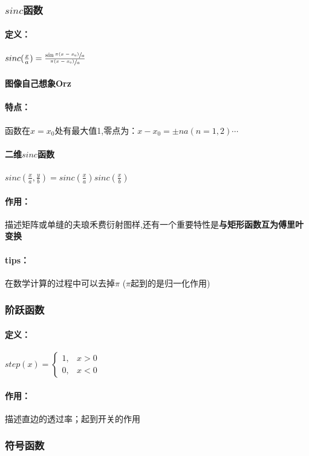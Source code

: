 \documentclass[UTF8]{ctexart}
\newcommand{\sinc}[1]{sinc(\f{x}{#1})}%
\newcommand{\sincc}[2]{sinc(\f{x}{#1},\f{y}{#2})}%
\newcommand{\f}[2]{\frac{#1}{#2}}%
\newcommand{\sfr}[2]{\sfrac{#1}{#2}}
\begin{document}
     \subsubsection{$sinc$函数}%
    \paragraph{定义：}$\sinc{a}=\f{\sin{\sfr{\pi(x-x_{0})}{a}}}{\sfr{\pi(x-x_{0})}{a}}$
    \paragraph{图像自己想象Orz}
    \paragraph{特点：}函数在$x=x_{0}$处有最大值1,零点为：$x-x_{0}=\pm na(n=1,2)\cdots$
    \paragraph{二维$sinc$函数}$\sincc{a}{b}=\sinc{a}\sinc{b}$
    \paragraph{作用：}
    描述矩阵或单缝的夫琅禾费衍射图样,还有一个重要特性是\textbf{与矩形函数互为傅里叶变换}
    \paragraph{tips：}在数学计算的过程中可以去掉$\pi$ ($\pi$起到的是归一化作用)
\subsubsection{阶跃函数}%
\paragraph{定义：}
$step(x) =
\begin{cases} 
1,  & x>0\\
0,  & x<0
\end{cases}%
$
\paragraph{作用：}描述直边的透过率；起到开关的作用
\subsubsection{符号函数}%
\end{document}
